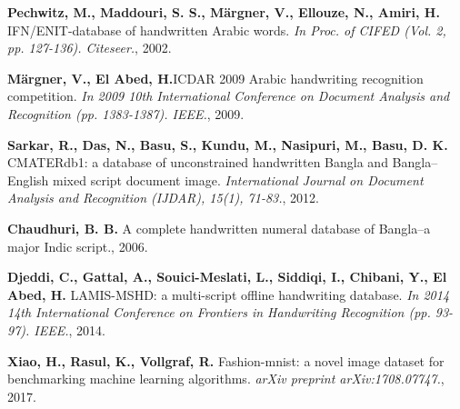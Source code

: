 \documentclass[eng]{simposium}
\begin{document}
\begin{thebibliography}{99}
\textbf{Pechwitz, M., Maddouri, S. S., Märgner, V., Ellouze, N., Amiri, H.} IFN/ENIT-database of handwritten Arabic words. \emph{In Proc. of CIFED (Vol. 2, pp. 127-136). Citeseer.}, 2002.

\textbf{Märgner, V., El Abed, H.}ICDAR 2009 Arabic handwriting recognition competition. \emph{In 2009 10th International Conference on Document Analysis and Recognition (pp. 1383-1387). IEEE.}, 2009.

\textbf{Sarkar, R., Das, N., Basu, S., Kundu, M., Nasipuri, M., Basu, D. K.} CMATERdb1: a database of unconstrained handwritten Bangla and Bangla–English mixed script document image. \emph{International Journal on Document Analysis and Recognition (IJDAR), 15(1), 71-83.}, 2012.

\textbf{Chaudhuri, B. B.} A complete handwritten numeral database of Bangla–a major Indic script., 2006.

\textbf{Djeddi, C., Gattal, A., Souici-Meslati, L., Siddiqi, I., Chibani, Y., El Abed, H.} LAMIS-MSHD: a multi-script offline handwriting database. \emph{In 2014 14th International Conference on Frontiers in Handwriting Recognition (pp. 93-97). IEEE.}, 2014.

\textbf{Xiao, H., Rasul, K., Vollgraf, R.} Fashion-mnist: a novel image dataset for benchmarking machine learning algorithms. \emph{arXiv preprint arXiv:1708.07747.}, 2017.

\end{thebibliography}
\end{document}
